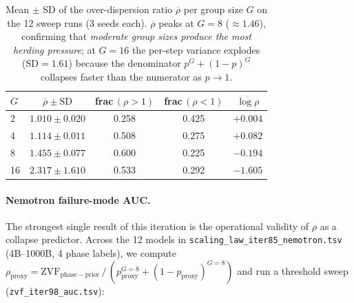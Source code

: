 \begin{table}[ht]\centering\small
\begin{tabular}{lcccc}
\toprule
$G$ & $\overline{\rho}\pm\mathrm{SD}$ & frac$\,(\rho>1)$ & frac$\,(\rho<1)$ & $\overline{\log\rho}$ \\
\midrule
2  & $1.010\pm 0.020$ & 0.258 & 0.425 & $+0.004$ \\
4  & $1.114\pm 0.011$ & 0.508 & 0.275 & $+0.082$ \\
8  & $1.455\pm 0.077$ & 0.600 & 0.225 & $-0.194$ \\
16 & $2.317\pm 1.610$ & 0.533 & 0.292 & $-1.605$ \\
\bottomrule
\end{tabular}
\caption{Mean $\pm$ SD of the over-dispersion ratio $\overline{\rho}$
per group size $G$ on the 12 sweep runs (3 seeds each).
$\overline{\rho}$ peaks at $G{=}8$ ($\approx 1.46$), confirming that
\emph{moderate group sizes produce the most herding pressure}; at
$G{=}16$ the per-step variance explodes (SD$=1.61$) because the
denominator $p^{G}+(1-p)^{G}$ collapses faster than the numerator as
$p\to1$.}
\label{tab:zvf-rho-binning}
\end{table}

\paragraph{Nemotron failure-mode AUC.}
The strongest single result of this iteration is the operational
validity of $\rho$ as a collapse predictor. Across the 12 models in
\texttt{scaling\_law\_iter85\_nemotron.tsv} (4B--1000B, 4 phase
labels), we compute
$\rho_{\mathrm{proxy}} = \mathrm{ZVF}_{\mathrm{phase-prior}} \,/\, (p_{\mathrm{proxy}}^{G{=}8} + (1-p_{\mathrm{proxy}})^{G{=}8})$
and run a threshold sweep (\texttt{zvf\_iter98\_auc.tsv}):

